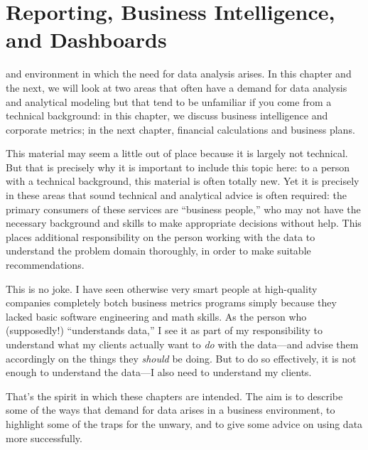 

\chapter{Reporting, Business Intelligence, and Dashboards}{}{}
\label{ch:buzzwords}


 and environment in which the need for
data analysis arises. In this chapter and the next, we will look at
two areas that often have a demand for data analysis and analytical
modeling but that tend to be unfamiliar if you come from a technical
background: in this chapter, we discuss business intelligence and
corporate metrics; in the next chapter, financial calculations and
business plans.

This material may seem a little out of place because it is largely not
technical. But that is precisely why it is important to include this
topic here: to a person with a technical background, this material is
often totally new. Yet it is precisely in these areas that sound
technical and analytical advice is often required: the primary
consumers of these services are ``business people,'' who may not have
the necessary background and skills to make appropriate decisions
without help. This places additional responsibility on the person
working with the data to understand the problem domain thoroughly, in
order to make suitable recommendations.

This is no joke. I have seen otherwise very smart people at
high-quality companies completely botch business metrics programs
simply because they lacked basic software engineering and math skills.
As the person who (supposedly!) ``understands data,'' I see it as part
of my responsibility to understand what my clients actually want to
\emph{do} with the data---and advise them accordingly on the things
they \emph{should} be doing. But to do so effectively, it is not
enough to understand the data---I also need to understand my clients.

That's the spirit in which these chapters are intended. The aim is to
describe some of the ways that demand for data arises in a business
environment, to highlight some of the traps for the unwary, and to
give some advice on using data more successfully.


